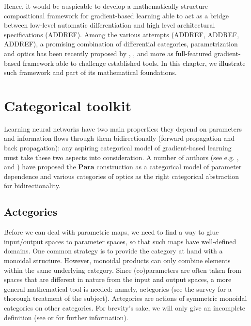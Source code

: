 \documentclass[11pt,a4paper,openright,twoside]{report}
\theoremstyle{plain}
\theoremstyle{definition}
\begin{document}
Hence, it would be auspicable to develop a mathematically structure compositional framework for gradient-based learning able to act as a bridge between low-level automatic differentiation and high level architectural specifications (ADDREF). Among the various attempts (ADDREF, ADDREF, ADDREF), a promising combination of differential categories, parametrization and optics has been recently proposed by \cite{cockett2019reverse}, \cite{cruttwell2022categorical}, \cite{gavranovic2024fundamental} and more as full-featured gradient-based framework able to challenge established tools. In this chapter, we illustrate such framework  and part of its mathematical foundations. 



\section{Categorical toolkit}

Learning neural networks have two main properties: they depend on parameters and information flows through them bidirectionally (forward propagation and back propagation): any aspiring categorical model of gradient-based learning must take these two aspects into consideration. A number of authors (see e.g. \cite{gavranovic2024fundamental}, and \cite{cruttwell2022categorical}) have proposed the $\mathbf{Para}$ construction as a categorical model of parameter dependence and various categories of optics as the right categorical abstraction for bidirectionality.

\subsection{Actegories}

Before we can deal with parametric maps, we need to find a way to glue input/output spaces to parameter spaces, so that such maps have well-defined domains. One common strategy is to provide the category at hand with a monoidal structure. However, monoidal products can only combine elements within the same underlying category. Since (co)parameters are often taken from spaces that are different in nature from the input and output spaces, a more general mathematical tool is needed: namely, actegories (see the survey \cite{capucci2022actegories} for a thorough treatment of the subject).  Actegories are actions of symmetric monoidal categories on other categories. For brevity's sake, we will only give an incomplete definition (see \cite{capucci2022actegories} or \cite{gavranovic2024fundamental} for further information).
\end{document}
